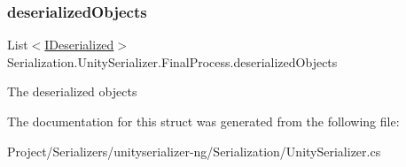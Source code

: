 \subsubsection{\texorpdfstring{deserialized\+Objects}{deserializedObjects}}
{\footnotesize\ttfamily List$<$\hyperlink{interface_i_deserialized}{I\+Deserialized}$>$ Serialization.\+Unity\+Serializer.\+Final\+Process.\+deserialized\+Objects}



The deserialized objects 



The documentation for this struct was generated from the following file\+:\begin{DoxyCompactItemize}
\item 
Project/\+Serializers/unityserializer-\/ng/\+Serialization/Unity\+Serializer.\+cs\end{DoxyCompactItemize}
